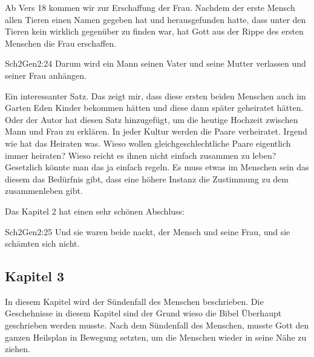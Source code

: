 Ab Vers 18 kommen wir zur Erschaffung der Frau. Nachdem der erste Mensch allen Tieren einen Namen gegeben hat und herausgefunden hatte, dass unter den Tieren kein wirklich gegenüber zu finden war, hat Gott aus der Rippe des ersten Menschen die Frau erschaffen.
\begin{bibeltext}{Sch2}{Gen}{2:24}
	Darum wird ein Mann seinen Vater und seine Mutter verlassen und seiner Frau anhängen.
\end{bibeltext}
Ein interessanter Satz. Das zeigt mir, dass diese ersten beiden Menschen auch im Garten Eden Kinder bekommen hätten und diese dann später geheiratet hätten. Oder der Autor hat diesen Satz hinzugefügt, um die heutige Hochzeit zwischen Mann und Frau zu erklären. In jeder Kultur werden die Paare verheiratet. Irgend wie hat das Heiraten was. Wieso wollen gleichgeschlechtliche Paare eigentlich immer heiraten? Wieso reicht es ihnen nicht einfach zusammen zu leben? Gesetzlich könnte man das ja einfach regeln. Es muss etwas im Menschen sein das diesem das Bedürfnis gibt, dass eine höhere Instanz die Zustimmung zu dem zusammenleben gibt.

Das Kapitel 2 hat einen sehr schönen Abschluss:
\begin{bibeltext}{Sch2}{Gen}{2:25}
	Und sie waren beide nackt, der Mensch und seine Frau, und sie schämten sich nicht.
\end{bibeltext}
\subsection{Kapitel 3}
In diesem Kapitel wird der Sündenfall des Menschen beschrieben. Die Geschehnisse in diesem Kapitel sind der Grund wieso die Bibel Überhaupt geschrieben werden musste. Nach dem Sündenfall des Menschen, musste Gott den ganzen Heilsplan in Bewegung setzten, um die Menschen wieder in seine Nähe zu ziehen.

